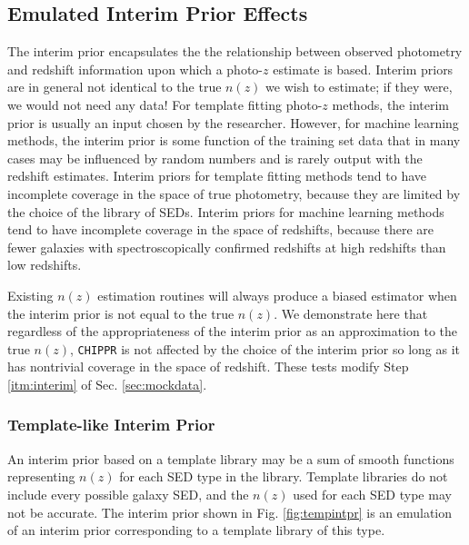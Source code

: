 \documentclass[iop]{emulateapj}
\newcommand{\chippr}{\texttt{CHIPPR} }
\begin{document}
\subsection{Emulated Interim Prior Effects}
\label{sec:priors}

The interim prior encapsulates the the relationship between observed photometry and redshift information upon which a photo-$z$ estimate is based.  Interim priors are in general not identical to the true $n(z)$ we wish to estimate; if they were, we would not need any data!  For template fitting photo-$z$ methods, the interim prior is usually an input chosen by the researcher.  However, for machine learning methods, the interim prior is some function of the training set data that in many cases may be influenced by random numbers and is rarely output with the redshift estimates.  Interim priors for template fitting methods tend to have incomplete coverage in the space of true photometry, because they are limited by the choice of the library of SEDs.  Interim priors for machine learning methods tend to have incomplete coverage in the space of redshifts, because there are fewer galaxies with spectroscopically confirmed redshifts at high redshifts than low redshifts.

Existing $n(z)$ estimation routines will always produce a biased estimator when the interim prior is not equal to the true $n(z)$.  We demonstrate here that regardless of the appropriateness of the interim prior as an approximation to the true $n(z)$, \chippr is not affected by the choice of the interim prior so long as it has nontrivial coverage in the space of redshift.  These tests modify Step \ref{itm:interim} of Sec. \ref{sec:mockdata}.

\subsubsection{Template-like Interim Prior}
\label{sec:tempintpr}

An interim prior based on a template library may be a sum of smooth functions representing $n(z)$ for each SED type in the library.  Template libraries do not include every possible galaxy SED, and the $n(z)$ used for each SED type may not be accurate.  The interim prior shown in Fig. \ref{fig:tempintpr} is an emulation of an interim prior corresponding to a template library of this type.
\end{document}
